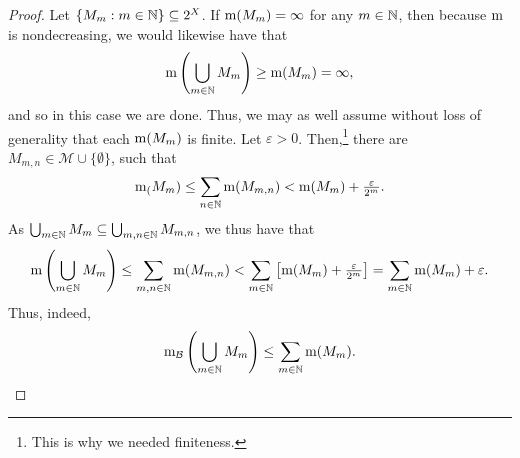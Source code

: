 \begin{thm}
\begin{savenotes}
\begin{proof}
Let $\{ M_m:m\in \mathbb{N} \} \subseteq 2^X$.  If $\mathrm{m} (M_m)=\infty$ for any $m\in \mathbb{N}$, then because $\mathrm{m}$ is nondecreasing, we would likewise have that
\begin{equation}
\mathrm{m} \left( \bigcup _{m\in \mathbb{N}}M_m\right) \geq \mathrm{m} (M_m)=\infty ,
\end{equation}
and so in this case we are done.  Thus, we may as well assume without loss of generality that each $\mathrm{m} (M_m)$ is finite.  Let $\varepsilon >0$.  Then,\footnote{This is why we needed finiteness.} there are $M_{m,n}\in \mathcal{M}\cup \{ \emptyset \}$, such that
\begin{equation}
\mathrm{m} _(M_m)\leq \sum _{n\in \mathbb{N}}\mathrm{m} (M_{m,n})<\mathrm{m} (M_m)+\tfrac{\varepsilon}{2^m}.
\end{equation}
As $\bigcup _{m\in \mathbb{N}}M_m\subseteq \bigcup _{m,n\in \mathbb{N}}M_{m,n}$, we thus have that
\begin{equation}
\mathrm{m} \left( \bigcup _{m\in \mathbb{N}}M_m\right) \leq \sum _{m,n\in \mathbb{N}}\mathrm{m} (M_{m,n})<\sum _{m\in \mathbb{N}}\left[ \mathrm{m} (M_m)+\tfrac{\varepsilon}{2^m}\right] =\sum _{m\in \mathbb{N}}\mathrm{m} (M_m)+\varepsilon .
\end{equation}
Thus, indeed,
\begin{equation}
\mathrm{m} _{\mathcal{B}}\left( \bigcup _{m\in \mathbb{N}}M_m\right) \leq \sum _{m\in \mathbb{N}}\mathrm{m} (M_m).
\end{equation}
\end{proof}
\end{savenotes}
\end{thm}

